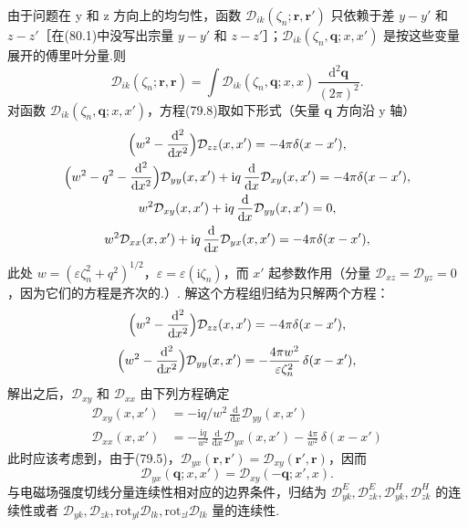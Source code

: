 由于问题在 y 和 z 方向上的均匀性，函数 $\mathcal{D}_{ik}(\zeta_n;\bm{r},\bm{r}')$ 只依赖于差 $y-y'$ 和 $z-z'$［在(80.1)中没写出宗量 $y-y'$ 和 $z-z'$］；$\mathcal{D}_{ik}(\zeta_n,\bm{q};x,x')$ 是按这些变量展开的傅里叶分量.则
\begin{equation}
  \mathcal{D}_{ik}(\zeta_n;\bm{r},\bm{r})=\int\mathcal{D}_{ik}(\zeta_n,\bm{q};x,x)\,\frac{\mathrm{d}^{2}\bm{q}}{(2\pi)^{2}}.
\end{equation}
对函数 $\mathcal{D}_{ik}(\zeta_n,\bm{q};x,x')$，方程(79.8)取如下形式（矢量 $\bm{q}$ 方向沿 y 轴）
\begin{equation*}
  \begin{gathered}
    \Bigl(w^{2}-\frac{\mathrm{d}^{2}}{\mathrm{d}x^{2}}\Bigr)\mathcal{D}_{zz}(x,x')=-4\pi\delta(x-x'),\\
    \Bigl(w^{2}-q^{2}-\frac{\mathrm{d}^{2}}{\mathrm{d}x^{2}}\Bigr)\mathcal{D}_{yy}(x,x')+\mathrm{i}q\,\frac{\mathrm{d}}{\mathrm{d}x}\mathcal{D}_{xy}(x,x')=-4\pi\delta(x-x'),\\
    w^{2}\mathcal{D}_{xy}(x,x')+\mathrm{i}q\,\frac{\mathrm{d}}{\mathrm{d}x}\mathcal{D}_{yy}(x,x')=0,\\
    w^{2}\mathcal{D}_{xx}(x,x')+\mathrm{i}q\,\frac{\mathrm{d}}{\mathrm{d}x}\mathcal{D}_{yx}(x,x')=-4\pi\delta(x-x'),
  \end{gathered}
\end{equation*}
此处 $w=(\varepsilon\zeta_n^{2}+q^{2})^{1/2}$，$\varepsilon=\varepsilon(\mathrm{i}\zeta_n)$，而 $x'$ 起参数作用（分量 $\mathcal{D}_{xz}=\mathcal{D}_{yz}=0$，因为它们的方程是齐次的.）. 解这个方程组归结为只解两个方程：
\begin{equation}
  \Bigl(w^{2}-\frac{\mathrm{d}^{2}}{\mathrm{d}x^{2}}\Bigr)\mathcal{D}_{zz}(x,x')=-4\pi\delta(x-x'),
\end{equation}
\begin{equation}
  \Bigl(w^{2}-\frac{\mathrm{d}^{2}}{\mathrm{d}x^{2}}\Bigr)\mathcal{D}_{yy}(x,x')=-\frac{4\pi w^{2}}{\varepsilon\zeta_n^{2}}\,\delta(x-x'),
\end{equation}
解出之后，$\mathcal{D}_{xy}$ 和 $\mathcal{D}_{xx}$ 由下列方程确定
\begin{equation}
  \begin{aligned}
    \mathcal{D}_{xy}(x,x')&=-\mathrm{i}q/w^{2}\,\frac{\mathrm{d}}{\mathrm{d}x}\mathcal{D}_{yy}(x,x')\\
    \mathcal{D}_{xx}(x,x')&=-\frac{\mathrm{i}q}{w^{2}}\,\frac{\mathrm{d}}{\mathrm{d}x}\mathcal{D}_{yx}(x,x')-\frac{4\pi}{w^{2}}\,\delta(x-x')
  \end{aligned}
\end{equation}
此时应该考虑到，由于(79.5)，$\mathcal{D}_{yx}(\bm{r},\bm{r}')=\mathcal{D}_{xy}(\bm{r}',\bm{r})$，因而
\begin{equation*}
  \mathcal{D}_{yx}(\bm{q};x,x')=\mathcal{D}_{xy}(-\bm{q};x',x).
\end{equation*}
与电磁场强度切线分量连续性相对应的边界条件，归结为 $\mathcal{D}^{E}_{yk},\allowbreak\mathcal{D}^{E}_{zk},\allowbreak\mathcal{D}^{H}_{yk},\allowbreak\mathcal{D}^{H}_{zk}$ 的连续性或者 $\mathcal{D}_{yk},\allowbreak\mathcal{D}_{zk},\allowbreak\mathrm{rot}_{yl}\mathcal{D}_{lk},\allowbreak\mathrm{rot}_{zl}\mathcal{D}_{lk}$ 量的连续性.

